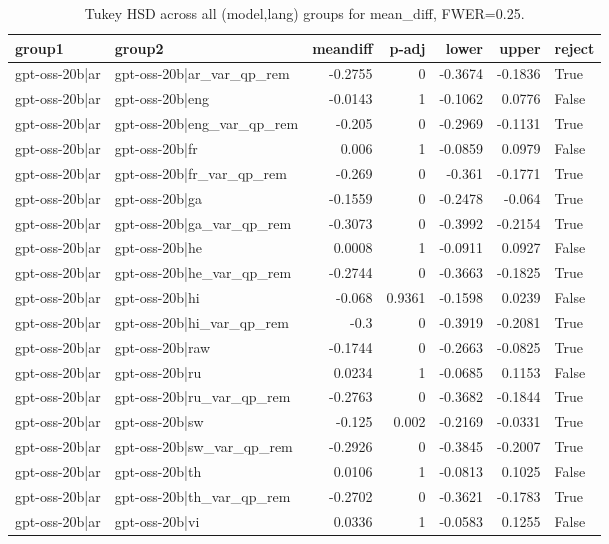 \begin{table}
\caption{Tukey HSD across all (model,lang) groups for mean_diff, FWER=0.25.}
\label{tab:tukey_all_models_all_langs_mean_diff}
\begin{tabular}{l l r r r r l}
\toprule
group1 & group2 & meandiff & p-adj & lower & upper & reject \\
\midrule
gpt-oss-20b|ar & gpt-oss-20b|ar_var_qp_rem & -0.2755 & 0 & -0.3674 & -0.1836 & True \\
gpt-oss-20b|ar & gpt-oss-20b|eng & -0.0143 & 1 & -0.1062 & 0.0776 & False \\
gpt-oss-20b|ar & gpt-oss-20b|eng_var_qp_rem & -0.205 & 0 & -0.2969 & -0.1131 & True \\
gpt-oss-20b|ar & gpt-oss-20b|fr & 0.006 & 1 & -0.0859 & 0.0979 & False \\
gpt-oss-20b|ar & gpt-oss-20b|fr_var_qp_rem & -0.269 & 0 & -0.361 & -0.1771 & True \\
gpt-oss-20b|ar & gpt-oss-20b|ga & -0.1559 & 0 & -0.2478 & -0.064 & True \\
gpt-oss-20b|ar & gpt-oss-20b|ga_var_qp_rem & -0.3073 & 0 & -0.3992 & -0.2154 & True \\
gpt-oss-20b|ar & gpt-oss-20b|he & 0.0008 & 1 & -0.0911 & 0.0927 & False \\
gpt-oss-20b|ar & gpt-oss-20b|he_var_qp_rem & -0.2744 & 0 & -0.3663 & -0.1825 & True \\
gpt-oss-20b|ar & gpt-oss-20b|hi & -0.068 & 0.9361 & -0.1598 & 0.0239 & False \\
gpt-oss-20b|ar & gpt-oss-20b|hi_var_qp_rem & -0.3 & 0 & -0.3919 & -0.2081 & True \\
gpt-oss-20b|ar & gpt-oss-20b|raw & -0.1744 & 0 & -0.2663 & -0.0825 & True \\
gpt-oss-20b|ar & gpt-oss-20b|ru & 0.0234 & 1 & -0.0685 & 0.1153 & False \\
gpt-oss-20b|ar & gpt-oss-20b|ru_var_qp_rem & -0.2763 & 0 & -0.3682 & -0.1844 & True \\
gpt-oss-20b|ar & gpt-oss-20b|sw & -0.125 & 0.002 & -0.2169 & -0.0331 & True \\
gpt-oss-20b|ar & gpt-oss-20b|sw_var_qp_rem & -0.2926 & 0 & -0.3845 & -0.2007 & True \\
gpt-oss-20b|ar & gpt-oss-20b|th & 0.0106 & 1 & -0.0813 & 0.1025 & False \\
gpt-oss-20b|ar & gpt-oss-20b|th_var_qp_rem & -0.2702 & 0 & -0.3621 & -0.1783 & True \\
gpt-oss-20b|ar & gpt-oss-20b|vi & 0.0336 & 1 & -0.0583 & 0.1255 & False \\

\end{tabular}
\end{table}
